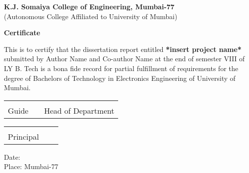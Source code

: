 
    \begin{center}
    
        \vspace*{0.1cm}
        \large
        \textbf{K.J. Somaiya College of Engineering, Mumbai-77}\\
        \normalsize
        (Autonomous College Affiliated to University of Mumbai)\\
        
        \vspace{0.8cm}
        
        \large
        \textbf{Certificate}\\
        \vspace{0.5cm}
        
    \end{center}
\noindent
{\large This is to certify that the dissertation report entitled \textbf{*insert project name*} submitted by Author Name and Co-author Name at the end of semester VIII of LY B. Tech is a bona fide record for partial fulfillment of requirements for the degree of Bachelors of Technology in Electronics Engineering of University of Mumbai.}
\vspace{2cm}

\begin{table}[h]
\centering
\begin{tabular}{Y Y Y}
\hrulefill & & \hrulefill \\
\large Guide & & \large Head of Department \\
\end{tabular}
\end{table}

\vspace{2cm}

\begin{table}[h]
\centering
\begin{tabular}{Y Y Y}
\hrulefill & & \\
\large Principal & & \\
\end{tabular}
\end{table}

\vspace{1cm}
\noindent
{\large Date:}\\
{\large Place: Mumbai-77}

